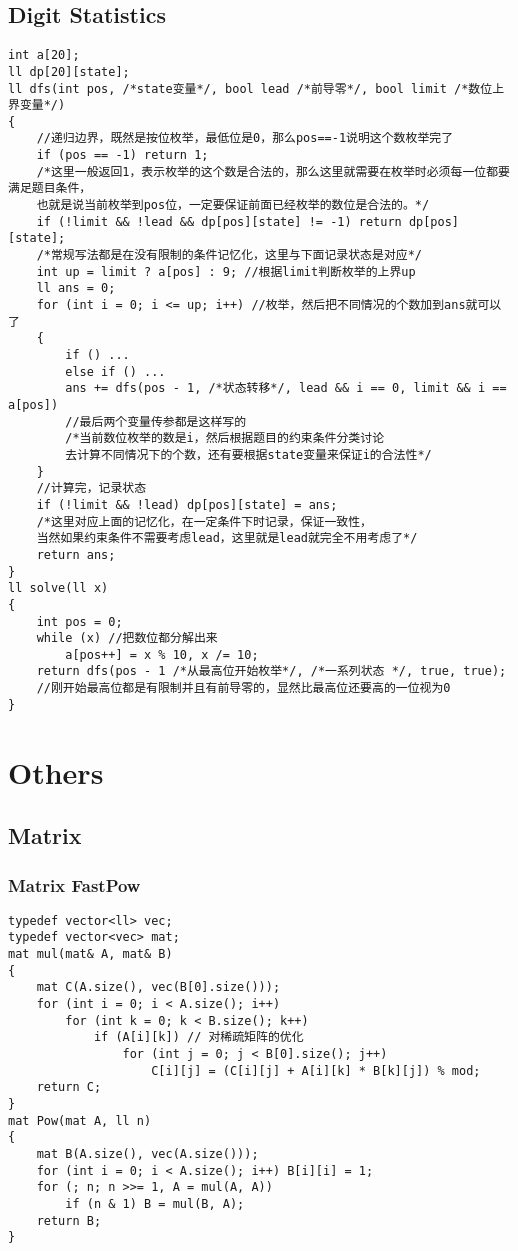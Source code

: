 \documentclass[twoside]{article}
\begin{document}
\subsection{Digit Statistics}
\begin{lstlisting}
int a[20];
ll dp[20][state];
ll dfs(int pos, /*state变量*/, bool lead /*前导零*/, bool limit /*数位上界变量*/)
{
    //递归边界，既然是按位枚举，最低位是0，那么pos==-1说明这个数枚举完了
    if (pos == -1) return 1;
    /*这里一般返回1，表示枚举的这个数是合法的，那么这里就需要在枚举时必须每一位都要满足题目条件，
    也就是说当前枚举到pos位，一定要保证前面已经枚举的数位是合法的。*/
    if (!limit && !lead && dp[pos][state] != -1) return dp[pos][state];
    /*常规写法都是在没有限制的条件记忆化，这里与下面记录状态是对应*/
    int up = limit ? a[pos] : 9; //根据limit判断枚举的上界up
    ll ans = 0;
    for (int i = 0; i <= up; i++) //枚举，然后把不同情况的个数加到ans就可以了
    {
        if () ...
        else if () ...
        ans += dfs(pos - 1, /*状态转移*/, lead && i == 0, limit && i == a[pos])
        //最后两个变量传参都是这样写的
        /*当前数位枚举的数是i，然后根据题目的约束条件分类讨论
        去计算不同情况下的个数，还有要根据state变量来保证i的合法性*/
    }
    //计算完，记录状态
    if (!limit && !lead) dp[pos][state] = ans;
    /*这里对应上面的记忆化，在一定条件下时记录，保证一致性，
    当然如果约束条件不需要考虑lead，这里就是lead就完全不用考虑了*/
    return ans;
}
ll solve(ll x)
{
    int pos = 0;
    while (x) //把数位都分解出来
        a[pos++] = x % 10, x /= 10;
    return dfs(pos - 1 /*从最高位开始枚举*/, /*一系列状态 */, true, true);
    //刚开始最高位都是有限制并且有前导零的，显然比最高位还要高的一位视为0
}
\end{lstlisting}
\clearpage\section{Others}
\subsection{Matrix}
\subsubsection{Matrix FastPow}
\begin{lstlisting}
typedef vector<ll> vec;
typedef vector<vec> mat;
mat mul(mat& A, mat& B)
{
    mat C(A.size(), vec(B[0].size()));
    for (int i = 0; i < A.size(); i++)
        for (int k = 0; k < B.size(); k++)
            if (A[i][k]) // 对稀疏矩阵的优化
                for (int j = 0; j < B[0].size(); j++)
                    C[i][j] = (C[i][j] + A[i][k] * B[k][j]) % mod;
    return C;
}
mat Pow(mat A, ll n)
{
    mat B(A.size(), vec(A.size()));
    for (int i = 0; i < A.size(); i++) B[i][i] = 1;
    for (; n; n >>= 1, A = mul(A, A))
        if (n & 1) B = mul(B, A);
    return B;
}
\end{lstlisting}
\end{document}
